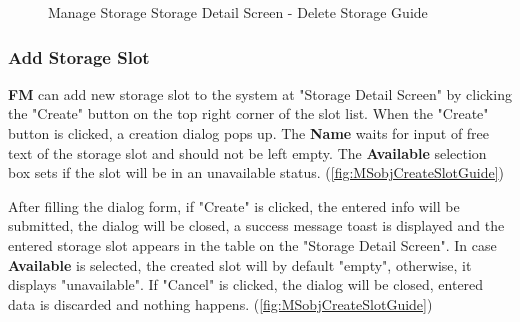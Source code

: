 \begin{figure}[H]
	\centering

    \caption{Manage Storage Storage Detail Screen - Delete Storage Guide}
	\label{fig:MSobjDeleteGuide}
\end{figure}


\subsubsection{Add Storage Slot}

\textbf{FM} can add new storage slot to the system at "Storage Detail Screen" by clicking the "Create" button on the top right corner of the slot list.
When the "Create" button is clicked, a creation dialog pops up. The \textbf{Name} waits for input of free text of the storage slot and should not be left empty. The \textbf{Available} selection box sets if the slot will be in an unavailable status.
(\autoref{fig:MSobjCreateSlotGuide})

After filling the dialog form, if "Create" is clicked, the entered info will be submitted, the dialog will be closed, a success message toast is displayed and the entered storage slot appears in the table on the "Storage Detail Screen". In case \textbf{Available} is selected, the created slot will by default "empty", otherwise, it displays "unavailable". If "Cancel" is clicked, the dialog will be closed, entered data is discarded and nothing happens.
(\autoref{fig:MSobjCreateSlotGuide})


